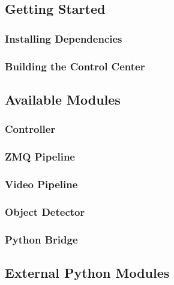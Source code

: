 \documentclass[12pt]{article}
\begin{document}
\subsection{Getting Started}
\label{subsec-getting-started}

\subsubsection{Installing Dependencies}
\label{subsubsec-installing-dependencies}

\subsubsection{Building the Control Center}
\label{subsubsec-building-control-center}

\subsection{Available Modules}
\label{subsec-available-modules}

\subsubsection{Controller}
\label{subsubsec-mod-controller}

\subsubsection{ZMQ Pipeline}
\label{subsubsec-mod-zmq-pipeline}

\subsubsection{Video Pipeline}
\label{subsubsec-mod-video-pipeline}

\subsubsection{Object Detector}
\label{subsubsec-mod-object-detector}

\subsubsection{Python Bridge}
\label{subsubsec-mod-py-bridge}

\subsection{External Python Modules}
\label{subsec-py-modules}
\end{document}
